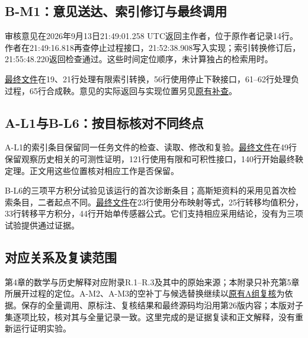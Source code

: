 \subsection[B-M1：意见送达、索引修订与最终调用]{\texorpdfstring{\protect\hypertarget{t2}{}B-M1：意见送达、索引修订与最终调用}{B-M1：意见送达、索引修订与最终调用}}
审核意见在2026年9月13日21:49:01.258 UTC返回主作者，位于原作者记录14行。作者在21:49:16.818再查停止过程接口，21:52:38.908写入实现；索引转换修订后，21:55:48.220返回检查通过。这些时间定位顺序，未计算独占的检索用时。

\href{research/final_sources/acceptance/r2-m1-b/technical/saved-sources/ProbabilityTheory/chapter_13/thm_13_17.lean}{最终文件}在19、21行处理有限索引转换，56行使用停止下鞅接口，61–62行处理负过程，65行合成鞅。意见的实际返回与实现位置另见\href{research/semantic/review_B_addendum.json}{原有补查}。

\subsection[A-L1与B-L6：按目标核对不同终点]{\texorpdfstring{\protect\hypertarget{t3}{}A-L1与B-L6：按目标核对不同终点}{A-L1与B-L6：按目标核对不同终点}}
A-L1的索引条目保留同一任务文件的检查、读取、修改和复验。\href{research/final_sources/acceptance/r2-l1-a/technical/saved-sources/ProbabilityTheory/chapter_13/prob_13_9.lean}{最终文件}在49行保留观察历史相关的可测性证明，121行使用有限和可积性接口，140行开始最终鞅定理。正文用这些位置核对相应工作是否保留。

B-L6的三项平方积分试验见该运行的首次诊断条目；高斯矩资料的采用见首次检索条目，二者起点不同。\href{research/final_sources/acceptance/r2-l6-b/technical/saved-sources/ProbabilityTheory/chapter_12/prob_12_5.lean}{最终文件}在23行使用分布映射等式，25行转移均值积分，33行转移平方积分，44行开始单传感器公式。它们支持相应采用结论，没有为三项试验提供通过证据。

\subsection[对应关系及复读范围]{\texorpdfstring{\protect\hypertarget{t4}{}对应关系及复读范围}{对应关系及复读范围}}
第4章的数学与历史解释对应附录R.1–R.3及其中的原始来源；本附录只补充第5章所展开过程的定位。A-M2、A-M3的空补丁与候选替换继续以\href{research/semantic/review_A.json}{原有A组复核}为依据。保存的全量调用、原标注、复核结果和最终源码均沿用第26版内容；本版对子集逐项比较，核对其与全量记录一致。这里完成的是证据复读和正文解释，没有重新运行证明实验。

